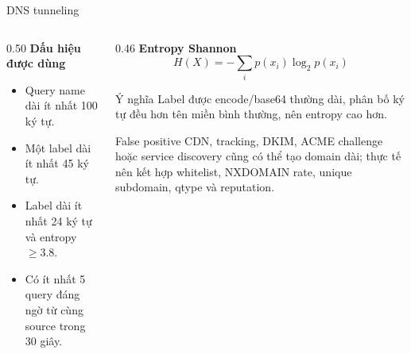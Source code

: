 \documentclass[t, aspectratio=169]{beamer}
\begin{document}
\begin{frame}{DNS tunneling}
    \begin{columns}[T,onlytextwidth]
        \begin{column}{0.50\textwidth}
            \textbf{Dấu hiệu được dùng}
            \begin{itemize}
                \item Query name dài ít nhất 100 ký tự.
                \item Một label dài ít nhất 45 ký tự.
                \item Label dài ít nhất 24 ký tự và entropy $\geq 3.8$.
                \item Có ít nhất 5 query đáng ngờ từ cùng source trong 30 giây.
            \end{itemize}
        \end{column}
        \begin{column}{0.46\textwidth}
            \textbf{Entropy Shannon}
            \[
                H(X) = -\sum_i p(x_i)\log_2 p(x_i)
            \]
            \begin{block}{Ý nghĩa}
                Label được encode/base64 thường dài, phân bố ký tự đều hơn tên miền bình thường, nên entropy cao hơn.
            \end{block}
            \begin{alertblock}{False positive}
                \footnotesize CDN, tracking, DKIM, ACME challenge hoặc service discovery cũng có thể tạo domain dài; thực tế nên kết hợp whitelist, NXDOMAIN rate, unique subdomain, qtype và reputation.
            \end{alertblock}
        \end{column}
    \end{columns}
\end{frame}
\end{document}
